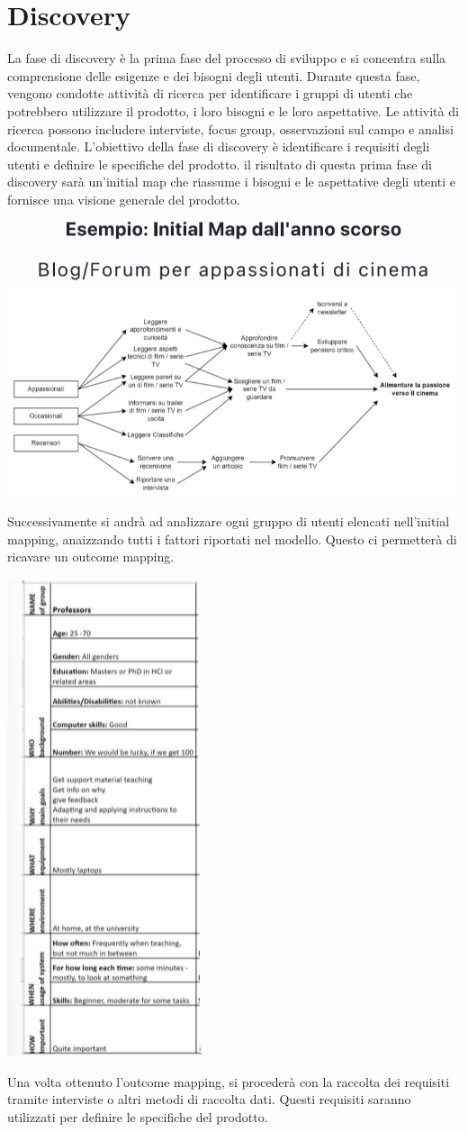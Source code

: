 \documentclass{report}
\begin{document}
	\section{Discovery}
	La fase di discovery è la prima fase del processo di sviluppo e si concentra sulla comprensione delle esigenze e dei bisogni degli utenti. Durante questa fase, vengono condotte attività di ricerca per identificare i gruppi di utenti che potrebbero utilizzare il prodotto, i loro bisogni e le loro aspettative. Le attività di ricerca possono includere interviste, focus group, osservazioni sul campo e analisi documentale. L'obiettivo della fase di discovery è identificare i requisiti degli utenti e definire le specifiche del prodotto. il risultato di questa prima fase di discovery sarà un'initial map che riassume i bisogni e le aspettative degli utenti e fornisce una visione generale del prodotto.
	\begin{center}
		\includegraphics[scale=0.5]{assets/discovery.png}
	\end{center}
	Successivamente si andrà ad analizzare ogni gruppo di utenti elencati nell'initial mapping, anaizzando tutti i fattori riportati nel modello. Questo ci permetterà di ricavare un outcome mapping.
	\begin{center}
		\includegraphics[scale=0.5]{assets/outcome.png}
	\end{center}
	Una volta ottenuto l'outcome mapping, si procederà con la raccolta dei requisiti tramite interviste o altri metodi di raccolta dati. Questi requisiti saranno utilizzati per definire le specifiche del prodotto. 
\end{document}
